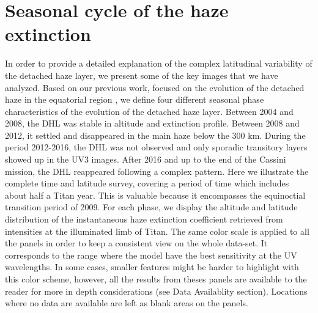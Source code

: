 \section{Seasonal cycle of the haze extinction}
\label{seq:lat_variations}

In order to provide a detailed explanation of the complex latitudinal variability of the detached haze layer, we present
some of the key images that we have analyzed. Based on our previous work, focused on the evolution of the detached haze in the
equatorial region \citep{West2018}, we define four different seasonal phase characteristics of the evolution of the detached haze layer.
Between 2004 and 2008, the DHL was stable in altitude and extinction profile.
Between 2008 and 2012, it settled and disappeared in the main haze below the 300 km.
During the period 2012-2016, the DHL was not observed and only sporadic transitory layers showed up in the UV3 images.
After 2016 and up to the end of the Cassini mission, the DHL reappeared following a complex pattern.
Here we illustrate the complete time and latitude survey, covering a period of time which includes about half a Titan year.
This is valuable because it encompasses the equinoctial transition period of 2009.
For each phase, we display the altitude and latitude distribution of the instantaneous haze extinction coefficient retrieved from intensities at the illuminated limb of Titan.
The same color scale is applied to all the panels in order to keep a consistent view on the whole data-set.
It corresponds to the range where the model have the best sensitivity at the UV wavelengths. In some cases, smaller features might be harder to highlight with this color scheme, however, all the results from theses panels are available to the reader for more in depth considerations (see Data Availablity section).
Locations where no data are available are left as blank areas on the panels.





